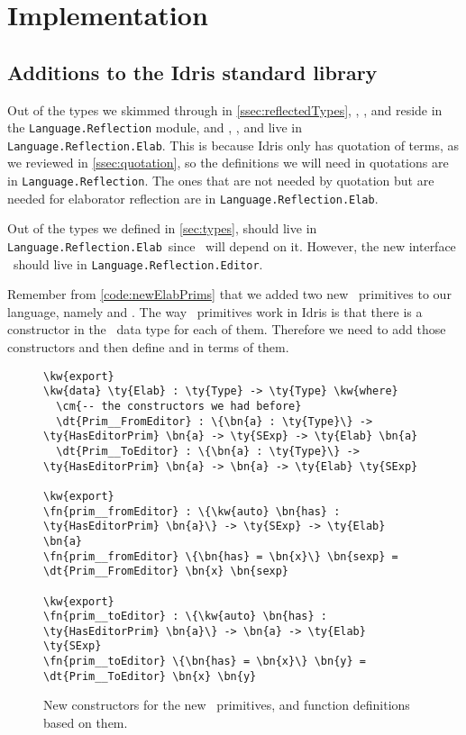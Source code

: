 \chapter{Implementation}\label{chap:implementation}

\section{Additions to the Idris standard library}\label{sec:stdlib}

\newcommand{\LR}{\texttt{Language.Reflection}}
\newcommand{\LRE}{\texttt{Language.Reflection.Elab}}
\newcommand{\LREd}{\texttt{Language.Reflection.Editor}}

Out of the types we skimmed through in \autoref{ssec:reflectedTypes}, \TT,
\Raw, and  reside in the \texttt{Language.Reflection} module, and
, , and  live in \LRE. This is because
Idris only has quotation of terms, as we reviewed in \autoref{ssec:quotation},
so the definitions we will need in quotations are in \LR. The ones that are not
needed by quotation but are needed for elaborator reflection are in \LRE.

Out of the types we defined in \autoref{sec:types},  should live in
\LRE\ since \Elab\ will depend on it. However, the new interface
\Editorable\ should live in \LREd.

Remember from \autoref{code:newElabPrims} that we added two new
\Elab\ primitives to our language, namely  and
.
The way \Elab\ primitives work in Idris is that there is a constructor in the
\Elab\ data type for each of them. Therefore we need to add those constructors
and then define  and  in terms of
them.

\begin{figure}[H]
\caption{New constructors for the new \Elab\ primitives, and function definitions based on them.}
  \label{code:newElabConstructors}
\begin{Verbatim}[framesep=2mm, label=\footnotesize{\normalfont{Idris}}, labelposition=topline]
\kw{export}
\kw{data} \ty{Elab} : \ty{Type} -> \ty{Type} \kw{where}
  \cm{-- the constructors we had before}
  \dt{Prim__FromEditor} : \{\bn{a} : \ty{Type}\} -> \ty{HasEditorPrim} \bn{a} -> \ty{SExp} -> \ty{Elab} \bn{a}
  \dt{Prim__ToEditor} : \{\bn{a} : \ty{Type}\} -> \ty{HasEditorPrim} \bn{a} -> \bn{a} -> \ty{Elab} \ty{SExp}

\kw{export}
\fn{prim__fromEditor} : \{\kw{auto} \bn{has} : \ty{HasEditorPrim} \bn{a}\} -> \ty{SExp} -> \ty{Elab} \bn{a}
\fn{prim__fromEditor} \{\bn{has} = \bn{x}\} \bn{sexp} = \dt{Prim__FromEditor} \bn{x} \bn{sexp}

\kw{export}
\fn{prim__toEditor} : \{\kw{auto} \bn{has} : \ty{HasEditorPrim} \bn{a}\} -> \bn{a} -> \ty{Elab} \ty{SExp}
\fn{prim__toEditor} \{\bn{has} = \bn{x}\} \bn{y} = \dt{Prim__ToEditor} \bn{x} \bn{y}
\end{Verbatim}
\end{figure}

